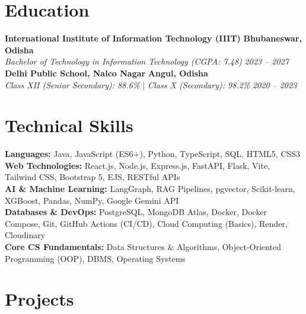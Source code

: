 \documentclass[letterpaper,10pt]{article}
\begin{document}
\section{Education}
\vspace{1pt}
\noindent
\textbf{International Institute of Information Technology (IIIT)} \hfill \textbf{Bhubaneswar, Odisha} \\
\textit{\small Bachelor of Technology in Information Technology (CGPA: 7.48)} \hfill \textit{\small 2023 -- 2027} \\ \vspace{1.5pt}
\textbf{Delhi Public School, Nalco Nagar} \hfill \textbf{Angul, Odisha} \\
\textit{\small Class XII (Senior Secondary): 88.6\% \hspace{0.4em}$|$\hspace{0.4em} Class X (Secondary): 98.2\%} \hfill \textit{\small 2020 -- 2023}

\section{Technical Skills}
\vspace{1pt}
\noindent\small
\textbf{Languages:} Java, JavaScript (ES6+), Python, TypeScript, SQL, HTML5, CSS3 \\
\textbf{Web Technologies:} React.js, Node.js, Express.js, FastAPI, Flask, Vite, Tailwind CSS, Bootstrap 5, EJS, RESTful APIs \\
\textbf{AI \& Machine Learning:} LangGraph, RAG Pipelines, pgvector, Scikit-learn, XGBoost, Pandas, NumPy, Google Gemini API \\
\textbf{Databases \& DevOps:} PostgreSQL, MongoDB Atlas, Docker, Docker Compose, Git, GitHub Actions (CI/CD), Cloud Computing (Basics), Render, Cloudinary \\
\textbf{Core CS Fundamentals:} Data Structures \& Algorithms, Object-Oriented Programming (OOP), DBMS, Operating Systems

\section{Projects}
\vspace{1pt}
\end{document}
